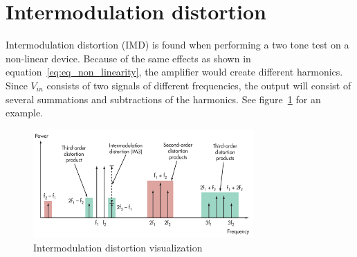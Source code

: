\section{Intermodulation distortion}

Intermodulation distortion (IMD) is found when performing a two tone test on a non-linear device. Because of the same effects as shown in equation~\ref{eq:eq_non_linearity}, the amplifier would create different harmonics. Since $V_{in}$ consists of two signals of different frequencies, the output will consist of several summations and subtractions of the harmonics. See figure~\ref{fig:fig_distortion_vis} for an example.

\begin{figure}[H]
	  \centering
	  \includegraphics[width=0.75\textwidth]{img/Intermodulation_distortion}
	  \caption{Intermodulation distortion visualization}
	  \label{fig:fig_distortion_vis}
\end{figure}
